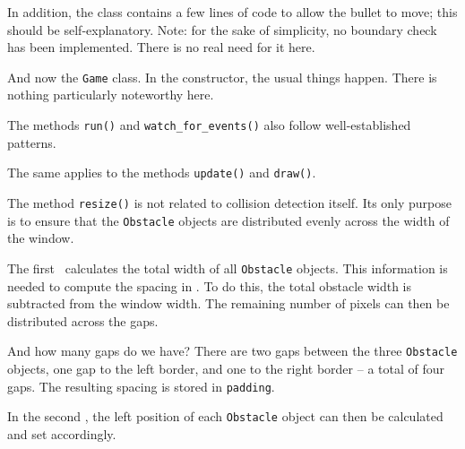 In addition, the class contains a few lines of code to allow the bullet to move; this should be self-explanatory. Note: for the sake of simplicity, no boundary check has been implemented. There is no real need for it here.



And now the \texttt{Game} class. In the constructor, the usual things happen. There is nothing particularly noteworthy here.


The methods \texttt{run()} and \texttt{watch\_for\_events()} also follow well-established patterns.


The same applies to the methods \texttt{update()} and \texttt{draw()}.


The method \texttt{resize()} is not related to collision detection itself. Its only purpose is to ensure that the \texttt{Obstacle} objects are distributed evenly across the width of the window.  

The first \forSchleife\ calculates the total width of all \texttt{Obstacle} objects. This information is needed to compute the spacing in . To do this, the total obstacle width is subtracted from the window width. The remaining number of pixels can then be distributed across the gaps.  

And how many gaps do we have? There are two gaps between the three \texttt{Obstacle} objects, one gap to the left border, and one to the right border -- a total of four gaps. The resulting spacing is stored in \texttt{padding}.  

In the second \forSchleife, the left position of each \texttt{Obstacle} object can then be calculated and set accordingly.



